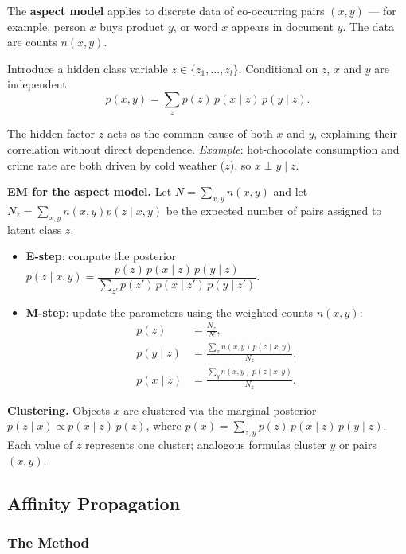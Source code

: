 \documentclass[11pt, oneside]{book}
\begin{document}
The \textbf{aspect model} applies to discrete data of co-occurring pairs
$(x,y)$ — for example, person $x$ buys product $y$, or word $x$ appears in
document $y$.
The data are counts $n(x,y)$.

\begin{defbox}[title={Aspect model}]
Introduce a hidden class variable $z \in \{z_1,\ldots,z_l\}$.
Conditional on $z$, $x$ and $y$ are independent:
\[
  p(x,y) = \sum_z p(z)\,p(x\mid z)\,p(y\mid z).
\]
\end{defbox}

The hidden factor $z$ acts as the common cause of both $x$ and $y$,
explaining their correlation without direct dependence.
\emph{Example}: hot-chocolate consumption and crime rate are both driven by
cold weather ($z$), so $x \perp y \mid z$.

\textbf{EM for the aspect model.}
Let $N=\sum_{x,y}n(x,y)$ and let
$N_z=\sum_{x,y}n(x,y)p(z\mid x,y)$ be the expected number of pairs assigned to
latent class $z$.
\begin{itemize}
  \item \textbf{E-step}: compute the posterior
        $p(z\mid x,y) = \dfrac{p(z)\,p(x\mid z)\,p(y\mid z)}
                               {\sum_{z'} p(z')\,p(x\mid z')\,p(y\mid z')}$.
  \item \textbf{M-step}: update the parameters using the weighted counts
        $n(x,y)$:
        \begin{align*}
          p(z) &= \frac{N_z}{N},\\
          p(y\mid z) &= \frac{\sum_x n(x,y)\,p(z\mid x,y)}{N_z},\\
          p(x\mid z) &= \frac{\sum_y n(x,y)\,p(z\mid x,y)}{N_z}.
        \end{align*}
\end{itemize}

\textbf{Clustering.}
Objects $x$ are clustered via the marginal posterior
$p(z\mid x) \propto p(x\mid z)\,p(z)$, where $p(x)=\sum_{z,y}p(z)\,p(x\mid z)\,p(y\mid z)$.
Each value of $z$ represents one cluster; analogous formulas cluster $y$ or
pairs $(x,y)$.

\subsection{Affinity Propagation}

\subsubsection{The Method}
\end{document}
